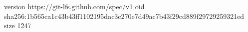 version https://git-lfs.github.com/spec/v1
oid sha256:1b565ca1c43b43ff1102195dac3c270e7d49ac7b43f29cd889f29729259321ed
size 1247
